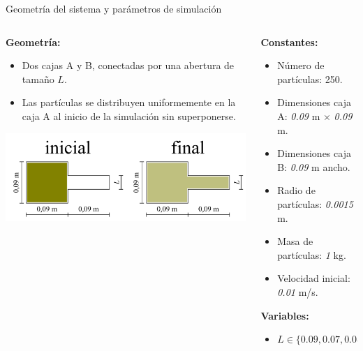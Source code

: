 \documentclass{beamer}
\begin{document}
\begin{frame}{Geometría del sistema y parámetros de simulación}
  \scriptsize
  \begin{columns}
    \begin{column}{0.5\textwidth}
      \textbf{Geometría:}
      \begin{itemize}
        \item Dos cajas A y B, conectadas por una abertura de tamaño $L$.
        \item Las partículas se distribuyen uniformemente en la caja A al inicio de la simulación sin superponerse.
      \end{itemize}
      \vspace{0.2cm}
      \begin{center}
        \includegraphics[width=0.85\linewidth]{photoMaterial/geometria.jpg}
      \end{center}
    \end{column}
    \begin{column}{0.5\textwidth}
      \textbf{Constantes:}
      \begin{itemize}
        \item Número de partículas: 250.
        \item Dimensiones caja A: \textit{0.09} m $\times$ \textit{0.09} m.
        \item Dimensiones caja B: \textit{0.09} m ancho.
        \item Radio de partículas: \textit{0.0015} m.
        \item Masa de partículas: \textit{1} kg.
        \item Velocidad inicial: \textit{0.01} m/s.
      \end{itemize}
      \vspace{0.2cm}
      \textbf{Variables:}
      \begin{itemize}
        \item $L \in \{ \textit{0.09}, \textit{0.07}, \textit{0.05}, \textit{0.03} \}$
      \end{itemize}
    \end{column}
  \end{columns}
\end{frame}
\end{document}
